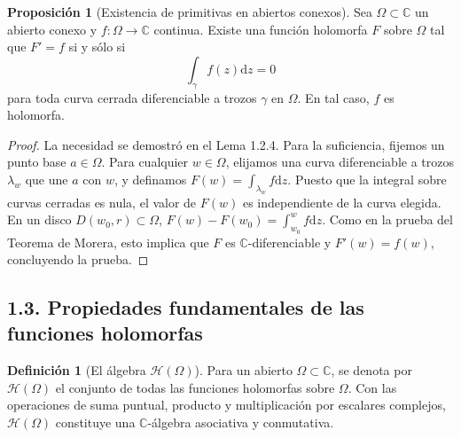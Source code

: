 \documentclass[11pt,a4paper]{article}
\theoremstyle{definition}
\newtheorem{definicion}{Definición}[section]
\newtheorem{proposicion}{Proposición}[section]
\theoremstyle{remark}
\numberwithin{equation}{section}
\newcommand{\dz}{\mathrm{d}z}
\begin{document}
\begin{proposicion}[Existencia de primitivas en abiertos conexos]
Sea $\Omega \subset \mathbb{C}$ un abierto conexo y $f: \Omega \to \mathbb{C}$ continua. Existe una función holomorfa $F$ sobre $\Omega$ tal que $F' = f$ si y sólo si
\begin{equation}
\int_\gamma f(z) \dz = 0
\end{equation}
para toda curva cerrada diferenciable a trozos $\gamma$ en $\Omega$. En tal caso, $f$ es holomorfa.
\end{proposicion}
\begin{proof}
La necesidad se demostró en el Lema 1.2.4. Para la suficiencia, fijemos un punto base $a \in \Omega$. Para cualquier $w \in \Omega$, elijamos una curva diferenciable a trozos $\lambda_w$ que une $a$ con $w$, y definamos $F(w) = \int_{\lambda_w} f \dz$. Puesto que la integral sobre curvas cerradas es nula, el valor de $F(w)$ es independiente de la curva elegida. En un disco $D(w_0,r) \subset \Omega$, $F(w) - F(w_0) = \int_{w_0}^w f \dz$. Como en la prueba del Teorema de Morera, esto implica que $F$ es $\mathbb{C}$-diferenciable y $F'(w) = f(w)$, concluyendo la prueba.
\end{proof}

\subsection{1.3. Propiedades fundamentales de las funciones holomorfas}

\begin{definicion}[El álgebra $\mathcal{H}(\Omega)$]
Para un abierto $\Omega \subset \mathbb{C}$, se denota por $\mathcal{H}(\Omega)$ el conjunto de todas las funciones holomorfas sobre $\Omega$. Con las operaciones de suma puntual, producto y multiplicación por escalares complejos, $\mathcal{H}(\Omega)$ constituye una $\mathbb{C}$-álgebra asociativa y conmutativa.
\end{definicion}
\end{document}
